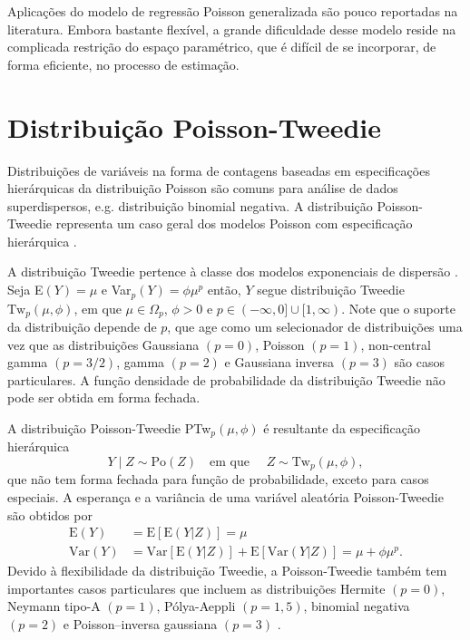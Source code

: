 \documentclass[
    oldfontcommands,
    11pt,
    openright,
    twoside,
    a4paper,
    english,
    brazil
]{abntex2}\usepackage[]{graphicx}\usepackage[]{color}
\begin{document}
Aplicações do modelo de regressão Poisson generalizada são pouco
reportadas na literatura. Embora bastante flexível, a grande dificuldade
desse modelo reside na complicada restrição do espaço paramétrico, que é
difícil de se incorporar, de forma eficiente, no processo de estimação.

\section{Distribuição Poisson-Tweedie}
\label{sec:poisson-tweedie}

Distribuições de variáveis na forma de contagens baseadas em
especificações hierárquicas da distribuição Poisson são comuns para
análise de dados superdispersos, e.g. distribuição binomial negativa. A
distribuição Poisson-Tweedie representa um caso geral dos modelos
Poisson com especificação hierárquica \citep[Seção 4.6]{Jorgensen1997}.

A distribuição Tweedie pertence à classe dos modelos exponenciais de
dispersão \citep{Jorgensen1997}. Seja E$(Y) = \mu$ e
Var$_p(Y) = \phi \mu^p$ então, $Y$ segue distribuição Tweedie
$\text{Tw}_p(\mu, \phi)$, em que $\mu \in \Omega_p$, $\phi > 0$ e
$p \in (-\infty, 0] \cup [1, \infty)$.  Note que o suporte da
distribuição depende de $p$, que age como um selecionador de
distribuições uma vez que as distribuições Gaussiana $(p = 0)$, Poisson
$(p = 1)$, non-central gamma $(p = 3/2)$, gamma $(p = 2)$ e Gaussiana
inversa $(p = 3)$ são casos particulares. A função densidade de
probabilidade da distribuição Tweedie não pode ser obtida em forma
fechada.

A distribuição Poisson-Tweedie PTw$_p(\mu, \phi)$ é resultante da
especificação hierárquica
\begin{equation}
  \label{eqn:espec-ptw}
  Y \mid Z \sim \text{Po}(Z) \quad \text{em que } \quad
    Z \sim \text{Tw}_p(\mu, \phi),
\end{equation}
que não tem forma fechada para função de probabilidade, exceto para
casos especiais. A esperança e a variância de uma variável aleatória
Poisson-Tweedie são obtidos por
\begin{equation}
  \label{eqn:moments-ptw}
  \begin{aligned}
  \text{E}(Y)   &= \text{E}[\text{E}(Y | Z)] = \mu \\
  \text{Var}(Y) &= \text{Var}[\text{E}(Y | Z)] +
    \text{E}[\text{Var}(Y | Z)] = \mu + \phi\mu^p.
  \end{aligned}
\end{equation}
Devido à flexibilidade da distribuição Tweedie, a Poisson-Tweedie também
tem importantes casos particulares que incluem as distribuições Hermite
$(p = 0)$, Neymann tipo-A $(p=1)$, Pólya-Aeppli $(p=1,5)$, binomial
negativa $(p=2)$ e Poisson--inversa gaussiana $(p = 3)$ \citep{Bonat2018}.
\end{document}
